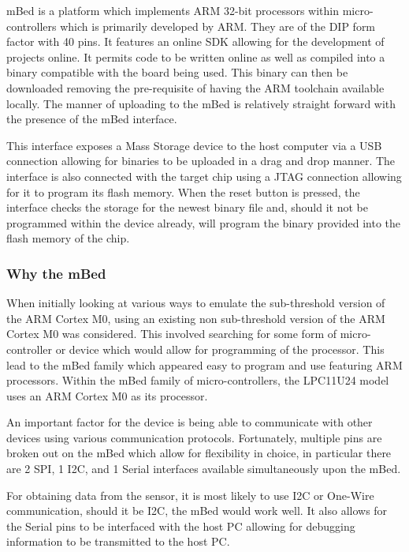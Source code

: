 
mBed is a platform which implements ARM 32-bit processors within micro-controllers which is primarily developed by ARM. They are of the DIP form factor with 40 pins. It features an online SDK allowing for the development of projects online. It permits code to be written online as well as compiled into a binary compatible with the board being used. This binary can then be downloaded removing the pre-requisite of having the ARM toolchain available locally. The manner of uploading to the mBed is relatively straight forward with the presence of the mBed interface. \cite{mbed_website}

This interface exposes a Mass Storage device to the host computer via a USB connection allowing for binaries to be uploaded in a drag and drop manner. The interface is also connected with the target chip using a JTAG connection allowing for it to program its flash memory. When the reset button is pressed, the interface checks the storage for the newest binary file and, should it not be programmed within the device already, will program the binary provided into the flash memory of the chip. \cite{mbed_website}

\subsubsection{Why the mBed}

When  initially looking at various ways to emulate the sub-threshold version of the ARM Cortex M0, using an existing non sub-threshold version of the ARM Cortex M0 was considered. This involved searching for some form of micro-controller or device which would allow for programming of the processor. This lead to the mBed family which appeared easy to program and use featuring ARM processors. Within the mBed family of micro-controllers, the LPC11U24 model uses an ARM Cortex M0 as its processor.

An important factor for the device is being able to communicate with other devices using various communication protocols. Fortunately, multiple pins are broken out on the mBed which allow for flexibility in choice, in particular there are 2 SPI, 1 I2C, and 1 Serial interfaces available simultaneously upon the mBed. \cite{mbed_website} 

For obtaining data from the sensor, it is most likely to use I2C or One-Wire communication, should it be I2C, the mBed would work well. It also allows for the Serial pins to be interfaced with the host PC allowing for debugging information to be transmitted to the host PC. 

